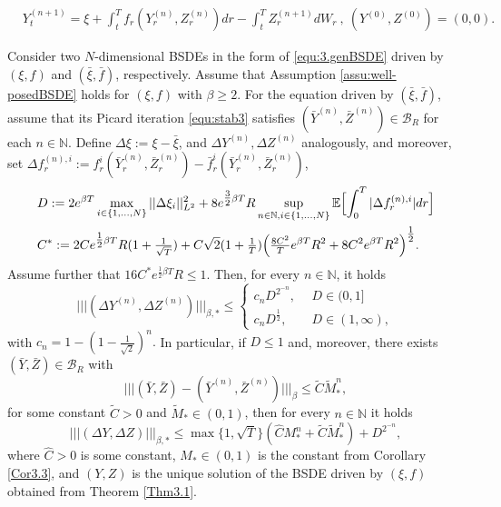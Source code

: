 \documentclass[10pt,a4paper]{amsart}
\newcommand{\be}{\begin{equation}}
\newcommand{\ee}{\end{equation}}
\newcommand{\trinm}[1]{\vert\!\vert\!\vert #1 \vert\!\vert\!\vert}
\begin{document}
\begin{align}
&Y_{t}^{(n+1)} = \xi + \int_{t}^{T}f_{r}(Y_{r}^{(n)},Z_{r}^{(n)})dr - \int_{t}^{T}Z_{r}^{(n+1)}dW_{r} \ , \ (Y^{(0)},Z^{(0)}) = (0,0). \label{equ:stab3}
\end{align}

\begin{Theorem}
\label{Thm3.9}

Consider two $N$-dimensional BSDEs in the form of \eqref{equ:3.genBSDE} driven by $(\xi, f)$ and $(\bar \xi, \bar f)$, respectively. Assume that Assumption \ref{assu:well-posedBSDE} holds for $(\xi,f)$ with $\beta \geq 2$. For the equation driven by $(\bar \xi, \bar f)$, assume that its Picard iteration \eqref{equ:stab3} satisfies $(\bar{Y}^{(n)},\bar{Z}^{(n)}) \in \mathcal{B}_{R}$ for each $n \in \mathbb{N}$. 
Define $\Delta \xi := \xi - \bar{\xi}$, and $  \Delta Y^{(n)}, \Delta Z^{(n)}$ analogously, and moreover, set $\Delta f_{r}^{(n),i} := f_{r}^{i}(\bar{Y}_{r}^{(n)},\bar{Z}_{r}^{(n)})-\bar{f}_{r}^{i}(\bar{Y}_{r}^{(n)},\bar{Z}_{r}^{(n)})$,
\begin{align*}
&D := 2e^{\beta T}\max_{i \in \{1,...,N\}}||\Delta \xi_{i}||_{L^{2}}^{2} + 8e^{\tfrac{3}{2}\beta T}R\sup_{n \in \mathbb{N},i \in \{1,...,N\}}\mathbb{E}\Bigl[\int_{0}^{T}|\Delta f_{r}^{(n),i}|dr\Bigr] \\
&C^{*} := 2Ce^{\tfrac{1}{2}\beta T}R(1+\tfrac{1}{\sqrt{T}}) + C\sqrt{2}(1+\tfrac{1}{T})\Bigl(\tfrac{8C^{2}}{T}e^{\beta T}R^{2} + 8C^{2}e^{\beta T}R^{2}\Bigr)^{\tfrac{1}{2}}.
\end{align*}
Assume further that $16C^{*}e^{\tfrac{1}{2}\beta T}R \leq 1$. Then, for every $n \in \mathbb{N}$, it holds
\be
\trinm{(\Delta Y^{(n)}, \Delta Z^{(n)})}_{\beta,*}  \le \left\{
\begin{array}{ll}
    c_n D^{2^{-n}}, \ \ &D \in (0,1]\\
    c_n D^{\frac12}, \ \ &D \in (1,\infty), 
\end{array}\right.
\ee
with $c_n= 1-(1- \frac{1}{\sqrt 2})^n.$ In particular, if $D \leq 1$ and, moreover, there exists $(\bar Y, \bar Z) \in  \mathcal{B}_{R}$ with
\begin{equation}
\label{equ:stab5}
\trinm{(\bar{Y},\bar{Z})-(\bar{Y}^{(n)},\bar{Z}^{(n)})}_{\beta} \leq \tilde{C}\tilde{M}_{*}^{n},
\end{equation}
for some constant $\tilde{C}>0$ and $\tilde{M}_{*} \in (0,1)$,
then for every $n \in \mathbb{N}$ it holds
\[
\trinm{(\Delta Y,\Delta Z)}_{\beta,*} \leq \max\{1,\sqrt{T}\}(\hat{C}M_{*}^{n} + \tilde{C}\tilde{M}_{*}^{n}) + D^{2^{-n}},
\]
where $\hat{C}>0$ is some constant, $M_{*} \in (0,1)$ is the constant from Corollary \ref{Cor3.3}, and $(Y,Z)$ is the unique solution of the BSDE driven by $(\xi,f)$ obtained from Theorem \ref{Thm3.1}.

\end{Theorem}
\end{document}
